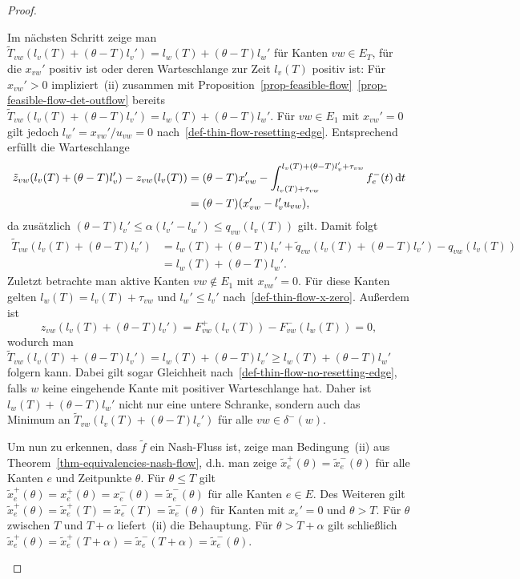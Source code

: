 \begin{proof}
\begin{description}[leftmargin=0cm, topsep=0cm, itemindent=0.5cm]
		Im nächsten Schritt zeige man $\tilde{T}_{vw}(l_v(T) + (\theta - T)l_v') = l_w(T) + (\theta - T) l_w'$ für Kanten $vw\in E_T$, für die $x_{vw}'$ positiv ist oder deren Warteschlange zur Zeit $l_v(T)$ positiv ist:
		Für $x_{vw}' > 0$ impliziert~(ii) zusammen mit Proposition~\ref{prop-feasible-flow}~\ref{prop-feasible-flow-det-outflow} bereits $\tilde{T}_{vw}(l_v(T) + (\theta-T)l_v') = l_w(T) + (\theta - T) l_w'$.
		Für $vw\in E_1$ mit $x_{vw}'=0$ gilt jedoch $l_w' = x_{vw}' / u_{vw} = 0$ nach~\ref{def-thin-flow-resetting-edge}.
		Entsprechend erfüllt die Warteschlange
		\begin{align*}
		\tilde{z}_{vw}(l_v(T) + (\theta - T)l_v') - z_{vw}(l_v(T)) &= (\theta - T) x_{vw}' - \int_{l_v(T) + \tau_{vw}}^{l_v(T) + (\theta - T) l_v' + \tau_{vw}} f_e^-(t) \mathop{}\!\mathrm{d} t \\
		&= (\theta - T) (x_{vw}' -l_v' u_{vw}),
		\end{align*}
		da zusätzlich $(\theta-T) l_v' \leq \alpha (l_v' - l_w') \leq q_{vw}(l_v(T))$ gilt.
		Damit folgt
		\begin{align*}
		\tilde{T}_{vw}(l_v(T) + (\theta - T)l_v') &= l_w(T) + (\theta - T) l_v' + \tilde{q}_{vw}(l_v(T) + (\theta - T)l_v')- q_{vw}(l_v(T)) \\
		&= l_w(T) + (\theta - T) l_w'.
		\end{align*}
		Zuletzt betrachte man aktive Kanten $vw\notin E_1$ mit $x_{vw}' = 0$.
		Für diese Kanten gelten $l_w(T) = l_v(T) + \tau_{vw}$ und $l_w' \leq l_v'$ nach~\ref{def-thin-flow-x-zero}.
		Außerdem ist 
		\[
		z_{vw}(l_v(T) + (\theta - T) l_v') = F_{vw}^+(l_v(T)) - F_{vw}^-(l_w(T)) = 0,
		\]
		wodurch man $\tilde{T}_{vw}(l_v(T) + (\theta - T) l_v') = l_w(T) + (\theta - T)l_v' \geq l_w(T) + (\theta - T) l_w'$ folgern kann.
		Dabei gilt sogar Gleichheit nach~\ref{def-thin-flow-no-resetting-edge}, falls $w$ keine eingehende Kante mit positiver Warteschlange hat.
		Daher ist $l_w(T)+(\theta - T) l_w'$ nicht nur eine untere Schranke, sondern auch das Minimum an $\tilde{T}_{vw}(l_v(T) + (\theta - T) l_v')$ für alle $vw\in \delta^-(w)$.
		
		Um nun zu erkennen, dass $\tilde{f}$ ein Nash-Fluss ist, zeige man Bedingung~(ii) aus Theorem~\ref{thm-equivalencies-nash-flow}, d.h. man zeige $\tilde{x}_e^+(\theta) = \tilde{x}_e^-(\theta)$ für alle Kanten $e$ und Zeitpunkte $\theta$.
		Für $\theta \leq T$ gilt $\tilde{x}_e^+(\theta) = x_e^+(\theta) = x_e^-(\theta) = \tilde{x}_e^-(\theta)$ für alle Kanten $e\in E$.
		Des Weiteren gilt $\tilde{x}_e^+(\theta) = \tilde{x}_e^+(T) = \tilde{x}_e^-(T) = \tilde{x}_e^-(\theta)$ für Kanten mit $x_{e}' = 0$ und $\theta > T$.
		Für $\theta$ zwischen $T$ und $T+\alpha$ liefert~(ii) die Behauptung.
		Für $\theta > T+\alpha$ gilt schließlich $\tilde{x}_e^+(\theta) = \tilde{x}_e^+(T + \alpha) = \tilde{x}_e^-(T+\alpha) = \tilde{x}_e^-(\theta)$.
\end{description}\vspace{-1.4em}
\end{proof}
